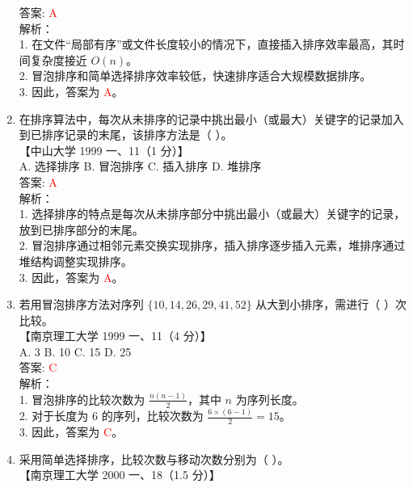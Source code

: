\documentclass[lang=cn,newtx,10pt,scheme=chinese]{../../../elegantbook}
\begin{document}
\begin{enumerate}
    答案: \textcolor{red}{A} \\

    解析：\\
    1. 在文件“局部有序”或文件长度较小的情况下，直接插入排序效率最高，其时间复杂度接近 $O(n)$。\\
    2. 冒泡排序和简单选择排序效率较低，快速排序适合大规模数据排序。\\
    3. 因此，答案为 \textcolor{red}{A}。\\

\item 在排序算法中，每次从未排序的记录中挑出最小（或最大）关键字的记录加入到已排序记录的末尾，该排序方法是（ ）。\\
    【中山大学 1999 一、11（1 分）】\\  

    A. 选择排序 \quad B. 冒泡排序 \quad C. 插入排序 \quad D. 堆排序 \\

    答案: \textcolor{red}{A} \\

    解析：\\
    1. 选择排序的特点是每次从未排序部分中挑出最小（或最大）关键字的记录，放到已排序部分的末尾。\\
    2. 冒泡排序通过相邻元素交换实现排序，插入排序逐步插入元素，堆排序通过堆结构调整实现排序。\\
    3. 因此，答案为 \textcolor{red}{A}。\\

\item 若用冒泡排序方法对序列 $\{10, 14, 26, 29, 41, 52\}$ 从大到小排序，需进行（ ）次比较。\\
    【南京理工大学 1999 一、11（4 分）】\\  

    A. 3 \quad B. 10 \quad C. 15 \quad D. 25 \\

    答案: \textcolor{red}{C} \\

    解析：\\
    1. 冒泡排序的比较次数为 $\frac{n(n-1)}{2}$，其中 $n$ 为序列长度。\\
    2. 对于长度为 6 的序列，比较次数为 $\frac{6 \times (6-1)}{2} = 15$。\\
    3. 因此，答案为 \textcolor{red}{C}。\\

    \item 采用简单选择排序，比较次数与移动次数分别为（ ）。\\
    【南京理工大学 2000 一、18（1.5 分）】\\  


\end{enumerate}
\end{document}

